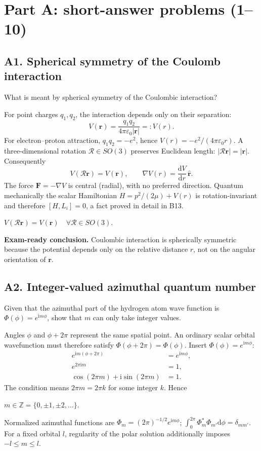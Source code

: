 \documentclass[11pt,a4paper]{article}
\newcommand{\key}[1]{\begin{resultbox}\centering\(\displaystyle #1\)\end{resultbox}}
\newcommand{\dd}{\mathrm{d}}
\newcommand{\iu}{\mathrm{i}}
\newcommand{\eps}{\varepsilon_0}
\begin{document}
\section{Part A: short-answer problems (1--10)}
\subsection{A1. Spherical symmetry of the Coulomb interaction}
\begin{questionbox}What is meant by spherical symmetry of the Coulombic interaction?\end{questionbox}
For point charges \(q_1,q_2\), the interaction depends only on their separation:
\begin{equation}V(\mathbf r)=\frac{q_1q_2}{4\pi\eps|\mathbf r|}=:V(r).\end{equation}
For electron--proton attraction, \(q_1q_2=-e^2\), hence \(V(r)=-e^2/(4\pi\eps r)\). A three-dimensional rotation \(\mathcal R\in SO(3)\) preserves Euclidean length: \(|\mathcal R\mathbf r|=|\mathbf r|\). Consequently
\begin{equation}V(\mathcal R\mathbf r)=V(\mathbf r),\qquad \nabla V(r)=\frac{\dd V}{\dd r}\,\hat{\mathbf r}.\end{equation}
The force \(\mathbf F=-\nabla V\) is central (radial), with no preferred direction. Quantum mechanically the scalar Hamiltonian \(H=p^2/(2\mu)+V(r)\) is rotation-invariant and therefore \([H,L_i]=0\), a fact proved in detail in B13.
\key{\boxed{V(\mathcal R\mathbf r)=V(\mathbf r)\quad\forall\mathcal R\in SO(3).}}
\textbf{Exam-ready conclusion.} Coulombic interaction is spherically symmetric because the potential depends only on the relative distance \(r\), not on the angular orientation of \(\mathbf r\).

\subsection{A2. Integer-valued azimuthal quantum number}
\begin{questionbox}Given that the azimuthal part of the hydrogen atom wave function is \(\Phi(\phi)=e^{\iu m\phi}\), show that \(m\) can only take integer values.\end{questionbox}
Angles \(\phi\) and \(\phi+2\pi\) represent the same spatial point. An ordinary scalar orbital wavefunction must therefore satisfy \(\Phi(\phi+2\pi)=\Phi(\phi)\). Insert \(\Phi(\phi)=e^{\iu m\phi}\):
\begin{align}
e^{\iu m(\phi+2\pi)}&=e^{\iu m\phi},\\
e^{2\pi\iu m}&=1,\\
\cos(2\pi m)+\iu\sin(2\pi m)&=1.
\end{align}
The condition means \(2\pi m=2\pi k\) for some integer \(k\). Hence
\key{\boxed{m\in\mathbb Z=\{0,\pm1,\pm2,\ldots\}.}}
Normalized azimuthal functions are \(\Phi_m=(2\pi)^{-1/2}e^{\iu m\phi}\); \(\int_0^{2\pi}\Phi_m^*\Phi_{m'}\dd\phi=\delta_{mm'}\). For a fixed orbital \(l\), regularity of the polar solution additionally imposes \(-l\le m\le l\).
\end{document}

